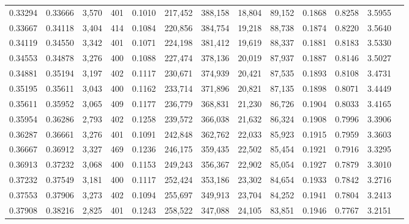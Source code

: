 \begin{tabular}{rrrrrrrrrrrrr}
0.33294 & 0.33666 &  3,570 &   401 &                                     0.1010 & 217,452 & 388,158 &  18,804 &  89,152 & 0.1868 & 0.8258 & 3.5955 \\
0.33667 & 0.34118 &  3,404 &   414 &                                     0.1084 & 220,856 & 384,754 &  19,218 &  88,738 & 0.1874 & 0.8220 & 3.5640 \\
0.34119 & 0.34550 &  3,342 &   401 &                                     0.1071 & 224,198 & 381,412 &  19,619 &  88,337 & 0.1881 & 0.8183 & 3.5330 \\
0.34553 & 0.34878 &  3,276 &   400 &                                     0.1088 & 227,474 & 378,136 &  20,019 &  87,937 & 0.1887 & 0.8146 & 3.5027 \\
0.34881 & 0.35194 &  3,197 &   402 &                                     0.1117 & 230,671 & 374,939 &  20,421 &  87,535 & 0.1893 & 0.8108 & 3.4731 \\
0.35195 & 0.35611 &  3,043 &   400 &                                     0.1162 & 233,714 & 371,896 &  20,821 &  87,135 & 0.1898 & 0.8071 & 3.4449 \\
0.35611 & 0.35952 &  3,065 &   409 &                                     0.1177 & 236,779 & 368,831 &  21,230 &  86,726 & 0.1904 & 0.8033 & 3.4165 \\
0.35954 & 0.36286 &  2,793 &   402 &                                     0.1258 & 239,572 & 366,038 &  21,632 &  86,324 & 0.1908 & 0.7996 & 3.3906 \\
0.36287 & 0.36661 &  3,276 &   401 &                                     0.1091 & 242,848 & 362,762 &  22,033 &  85,923 & 0.1915 & 0.7959 & 3.3603 \\
0.36667 & 0.36912 &  3,327 &   469 &                                     0.1236 & 246,175 & 359,435 &  22,502 &  85,454 & 0.1921 & 0.7916 & 3.3295 \\
0.36913 & 0.37232 &  3,068 &   400 &                                     0.1153 & 249,243 & 356,367 &  22,902 &  85,054 & 0.1927 & 0.7879 & 3.3010 \\
0.37232 & 0.37549 &  3,181 &   400 &                                     0.1117 & 252,424 & 353,186 &  23,302 &  84,654 & 0.1933 & 0.7842 & 3.2716 \\
0.37553 & 0.37906 &  3,273 &   402 &                                     0.1094 & 255,697 & 349,913 &  23,704 &  84,252 & 0.1941 & 0.7804 & 3.2413 \\
0.37908 & 0.38216 &  2,825 &   401 &                                     0.1243 & 258,522 & 347,088 &  24,105 &  83,851 & 0.1946 & 0.7767 & 3.2151 \\

\end{tabular}
